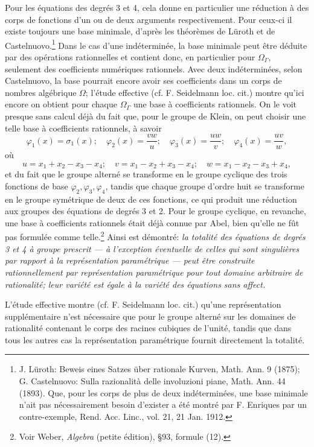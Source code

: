 Pour les équations des degrés 3 et 4, cela donne en particulier une réduction à des corps de fonctions d'un ou de deux arguments respectivement. Pour ceux-ci il existe toujours une base minimale, d'après les théorèmes de Lüroth et de Castelnuovo.\footnote{J. Lüroth: \og{}Beweis eines Satzes über rationale Kurven\fg{}, Math. Ann. 9 (1875); G. Castelnuovo: \og{}Sulla razionalità delle involuzioni piane\fg{}, Math. Ann. 44 (1893). Que, pour les corps de plus de deux indéterminées, une base minimale n'ait pas nécessairement besoin d'exister a été montré par F. Enriques par un contre-exemple, Rend. Acc. Linc., vol. 21, 21 Jan. 1912.} Dans le cas d'une indéterminée, la base minimale peut être déduite par des opérations rationnelles et contient donc, en particulier pour $\Omega_\Gamma$, seulement des coefficients numériques rationnels. Avec deux indéterminées, selon Castelnuovo, la base pourrait encore avoir ses coefficients dans un corps de nombres algébrique $\Omega$; l'étude effective (cf. F. Seidelmann loc. cit.) montre qu'ici encore on obtient pour chaque $\Omega_\Gamma$ une base à coefficients rationnels. On le voit presque sans calcul déjà du fait que, pour le groupe de Klein, on peut choisir une telle base à coefficients rationnels, à savoir
\[
\varphi_1(x)=\sigma_1(x);\quad
\varphi_2(x)=\frac{vw}{u};\quad
\varphi_3(x)=\frac{uw}{v};\quad
\varphi_4(x)=\frac{uv}{w},
\]
où
\[
u=x_1+x_2-x_3-x_4;\quad v=x_1-x_2+x_3-x_4;\quad w=x_1-x_2-x_3+x_4,
\]
et du fait que le groupe alterné se transforme en le groupe cyclique des trois fonctions de base $\varphi_2,\varphi_3,\varphi_4$, tandis que chaque groupe d'ordre huit se transforme en le groupe symétrique de deux de ces fonctions, ce qui produit une réduction aux groupes des équations de degrés 3 et 2. Pour le groupe cyclique, en revanche, une base à coefficients rationnels était déjà connue par Abel, bien qu'elle ne fût pas formulée comme telle.\footnote{Voir Weber, \emph{Algebra} (petite édition), \S 93, formule (12).} Ainsi est démontré: \emph{la totalité des équations de degrés 3 et 4 à groupe prescrit --- à l'exception éventuelle de celles qui sont singulières par rapport à la représentation paramétrique --- peut être construite rationnellement par représentation paramétrique pour tout domaine arbitraire de rationalité; leur variété est égale à la variété des équations sans affect.}

L'étude effective montre (cf. F. Seidelmann loc. cit.) qu'une représentation supplémentaire n'est nécessaire que pour le groupe alterné sur les domaines de rationalité contenant le corps des racines cubiques de l'unité, tandis que dans tous les autres cas la représentation paramétrique fournit directement la totalité.

